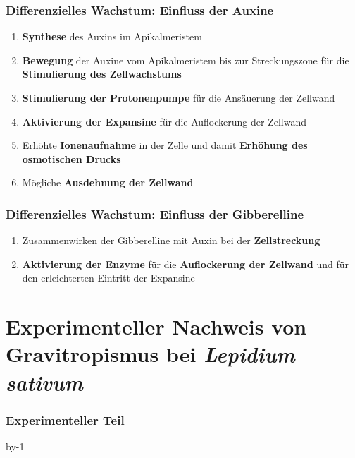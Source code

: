 \documentclass[aspectratio=169
]{beamer}
\makeatletter
\newcommand{\trickbeamer}{%
	\advance\beamer@slideinframe by-1%
}%
\makeatother
\begin{document}
\begin{frame}[<+(1)->]
\frametitle{Differenzielles Wachstum: Einfluss der Auxine}
\begin{enumerate}
\item \textbf{Synthese} des Auxins im Apikalmeristem 
\item \textbf{Bewegung} der Auxine vom Apikalmeristem bis zur Streckungszone für die \textbf{Stimulierung des Zellwachstums}
\item \textbf{Stimulierung der Protonenpumpe} für die Ansäuerung der Zellwand 
\item \textbf{Aktivierung der Expansine} für die Auflockerung der Zellwand
\item Erhöhte \textbf{Ionenaufnahme} in der Zelle und damit \textbf{Erhöhung des osmotischen Drucks}
\item Mögliche \textbf{Ausdehnung der Zellwand}
\end{enumerate}
\end{frame}
	
\begin{frame}[<+(1)->]
\frametitle{Differenzielles Wachstum: Einfluss der Gibberelline}
\begin{enumerate}
	\item Zusammenwirken der Gibberelline mit Auxin bei der \textbf{Zellstreckung}
	\item \textbf{Aktivierung der Enzyme} für die \textbf{Auflockerung der Zellwand} und für den erleichterten Eintritt der Expansine
\end{enumerate}
\end{frame}

\section{Experimenteller Nachweis von Gravitropismus bei \protect\emph{Lepidium sativum}}
	
\begin{frame}[<+(1)->]
\frametitle{Experimenteller Teil}
\pause
\trickbeamer		
\tableofcontents[currentsection, sections=2, pausesections, pausesubsections, subsectionstyle=show/show/shaded, subsubsectionstyle=show/show/show/shaded]
		



\end{frame}	
	
\end{document}
